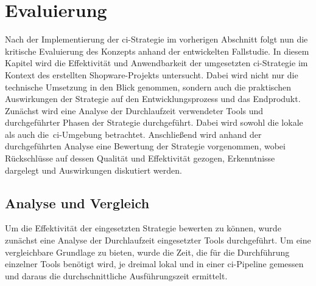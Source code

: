 
\section{Evaluierung} \label{sec:05-evaluation}

Nach der Implementierung der \acrshort{ci}-Strategie im vorherigen Abschnitt folgt nun
die kritische Evaluierung des Konzepts anhand der entwickelten Fallstudie.
In diesem Kapitel wird die Effektivität und Anwendbarkeit der umgesetzten \acrshort{ci}-Strategie im Kontext des
erstellten Shopware-Projekts untersucht.
Dabei wird nicht nur die technische Umsetzung in den Blick genommen, sondern auch die praktischen Auswirkungen der
Strategie auf den Entwicklungsprozess und das Endprodukt.
Zunächst wird eine Analyse der Durchlaufzeit verwendeter Tools und durchgeführter Phasen der Strategie durchgeführt.
Dabei wird sowohl die lokale als auch die\ \acrshort{ci}-Umgebung betrachtet.
Anschließend wird anhand der durchgeführten Analyse eine Bewertung der Strategie vorgenommen, wobei Rückschlüsse auf
dessen Qualität und Effektivität gezogen, Erkenntnisse dargelegt und Auswirkungen diskutiert werden.

\subsection{Analyse und Vergleich} \label{subsec:05-evaluation-1}

Um die Effektivität der eingesetzten Strategie bewerten zu können, wurde zunächst eine Analyse der Durchlaufzeit
eingesetzter Tools durchgeführt.
Um eine vergleichbare Grundlage zu bieten, wurde die Zeit, die für die Durchführung einzelner Tools benötigt wird, je
dreimal lokal und in einer \acrshort{ci}-Pipeline gemessen und daraus die durchschnittliche Ausführungszeit ermittelt.

